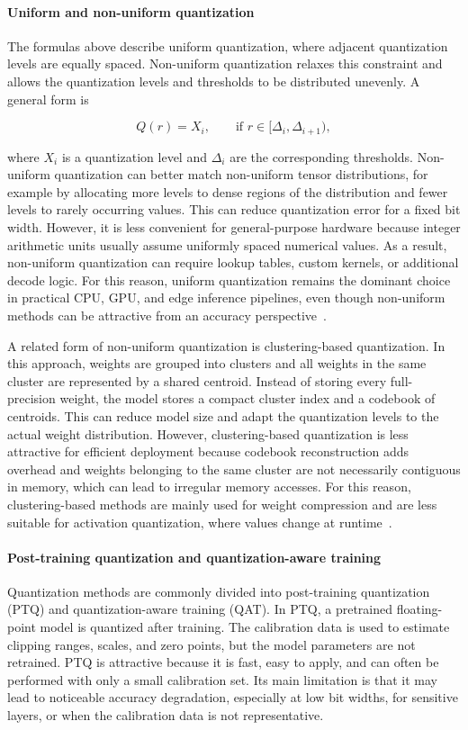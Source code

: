 \documentclass[12pt,a4paper]{report}
\begin{document}
\paragraph{Uniform and non-uniform quantization}
The formulas above describe uniform quantization, where adjacent quantization levels are equally
spaced. Non-uniform quantization relaxes this constraint and allows the quantization levels and
thresholds to be distributed unevenly. A general form is

\begin{equation}
Q(r) = X_i, \qquad \text{if } r \in [\Delta_i, \Delta_{i+1}),
\end{equation}

where $X_i$ is a quantization level and $\Delta_i$ are the corresponding thresholds. Non-uniform
quantization can better match non-uniform tensor distributions, for example by allocating more
levels to dense regions of the distribution and fewer levels to rarely occurring values. This can
reduce quantization error for a fixed bit width. However, it is less convenient for general-purpose
hardware because integer arithmetic units usually assume uniformly spaced numerical values.
As a result, non-uniform quantization can require lookup tables, custom kernels, or additional
decode logic. For this reason, uniform quantization remains the dominant choice in practical CPU,
GPU, and edge inference pipelines, even though non-uniform methods can be attractive from an
accuracy perspective~\cite{gholami2022survey}.

A related form of non-uniform quantization is clustering-based quantization. In this approach,
weights are grouped into clusters and all weights in the same cluster are represented by a shared
centroid. Instead of storing every full-precision weight, the model stores a compact cluster index
and a codebook of centroids. This can reduce model size and adapt the quantization levels to the
actual weight distribution. However, clustering-based quantization is less attractive for efficient
deployment because codebook reconstruction adds overhead and weights belonging to the same
cluster are not necessarily contiguous in memory, which can lead to irregular memory accesses.
For this reason, clustering-based methods are mainly used for weight compression and are less
suitable for activation quantization, where values change at runtime~\cite{rokh2023comprehensive}.

\paragraph{Post-training quantization and quantization-aware training}
Quantization methods are commonly divided into post-training quantization (PTQ) and
quantization-aware training (QAT). In PTQ, a pretrained floating-point model is quantized after
training. The calibration data is used to estimate clipping ranges, scales, and zero points, but the
model parameters are not retrained. PTQ is attractive because it is fast, easy to apply, and can
often be performed with only a small calibration set. Its main limitation is that it may lead to
noticeable accuracy degradation, especially at low bit widths, for sensitive layers, or when the
calibration data is not representative.
\end{document}
